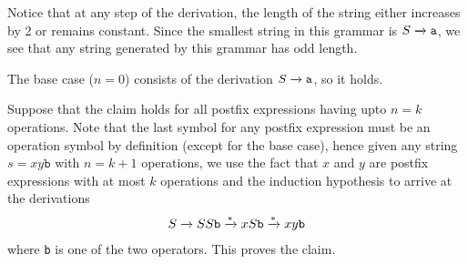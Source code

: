 \begin{solution}
\begin{enumerate}[label=\alph*)]
        \noindent Notice that at any step of the derivation, the length of the string 
        either increases by 2 or remains constant. Since the smallest string in this
        grammar is $S \xrightarrow{} \texttt{a}$, we see that any string generated by this 
        grammar has odd length.

        \noindent The base case ($n = 0$) consists of the derivation $S \xrightarrow{} 
        \texttt{a}$, so it holds.

        \noindent Suppose that the claim holds for all postfix expressions having 
        upto $n = k$ operations. Note that the last symbol for any postfix expression 
        must be an operation symbol by definition (except for the base case), 
        hence given any string $s = xy\texttt{b}$ with $n = k + 1$ operations, 
        we use the fact that $x$ and $y$ are postfix expressions with at most 
        $k$ operations and the induction hypothesis to arrive at the derivations
        \begin{align*}
            S \xrightarrow{} SS\texttt{b} 
            \xrightarrow{*} xS\texttt{b} 
            \xrightarrow{*} xy\texttt{b}
        \end{align*}
        where \texttt{b} is one of the two operators. This proves the claim.
    \end{enumerate}
\end{solution}